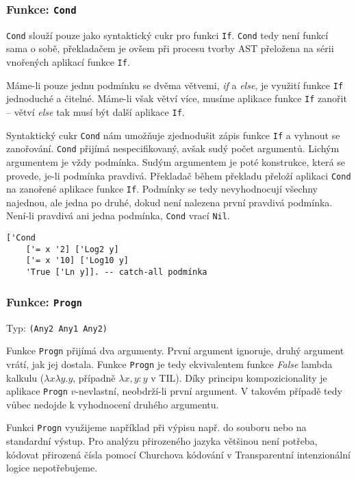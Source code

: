 \subsubsection*{Funkce: \lstinline{Cond}}

\lstinline{Cond} slouží pouze jako syntaktický cukr pro funkci \lstinline{If}. \lstinline{Cond} tedy
není funkcí sama o sobě, překladačem je ovšem při procesu tvorby AST přeložena na sérii vnořených
aplikací funkce \lstinline{If}.

Máme-li pouze jednu podmínku se dvěma větvemi, \textit{if} a \textit{else}, je využití funkce
\lstinline{If} jednoduché a čitelné. Máme-li však větví více, musíme aplikace funkce \lstinline{If}
zanořit -- větví \textit{else} tak musí být další aplikace \lstinline{If}.

Syntaktický cukr \lstinline{Cond} nám umožňuje zjednodušit zápis funkce \lstinline{If} a vyhnout
se zanořování. \lstinline{Cond} přijímá nespecifikovaný, avšak sudý počet argumentů. Lichým
argumentem je vždy podmínka. Sudým argumentem je poté konstrukce, která se provede, je-li podmínka
pravdivá. Překladač během překladu přeloží aplikaci \lstinline{Cond} na zanořené aplikace funkce
\lstinline{If}. Podmínky se tedy nevyhodnocují všechny najednou, ale jedna po druhé, dokud není
nalezena první pravdivá podmínka. Není-li pravdivá ani jedna podmínka, \lstinline{Cond} vrací
\lstinline{Nil}.

\begin{lstlisting}[caption={Ukázka využití Cond}]
['Cond
    ['= x '2] ['Log2 y]
    ['= x '10] ['Log10 y]
    'True ['Ln y]]. -- catch-all podmínka
\end{lstlisting}

\subsubsection*{Funkce: \lstinline{Progn}}
Typ: \lstinline{(Any2 Any1 Any2)}

Funkce \lstinline{Progn} přijímá dva argumenty. První argument ignoruje, druhý argument vrátí, jak
jej dostala. Funkce \lstinline{Progn} je tedy ekvivalentem funkce \textit{False} lambda kalkulu
($\lambda x \lambda y . y$, případně $\lambda x, y: y$ v TIL). Díky principu kompozicionality je aplikace
\lstinline{Progn} $v$-nevlastní, neobdrží-li první argument. V takovém případě tedy vůbec nedojde
k vyhodnocení druhého argumentu.

Funkci \lstinline{Progn} využijeme například při výpisu např. do souboru nebo na standardní výstup.
Pro analýzu přirozeného jazyka většinou není potřeba, kódovat přirozená čísla pomocí Churchova
kódování v Transparentní intenzionální logice nepotřebujeme.

